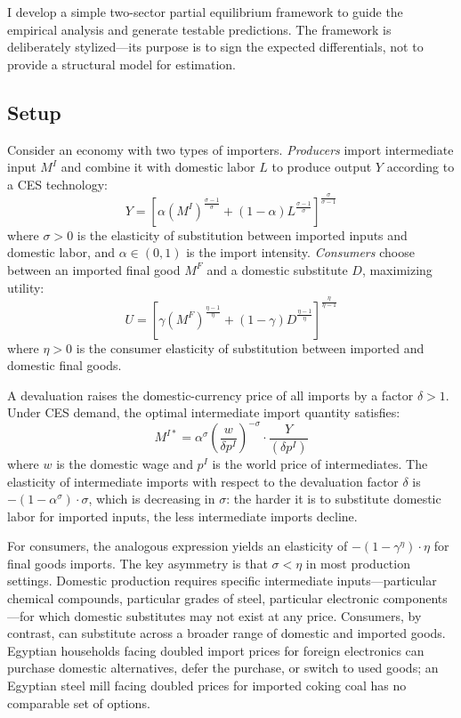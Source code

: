 \documentclass[12pt]{article}
\begin{document}
I develop a simple two-sector partial equilibrium framework to guide the empirical analysis and generate testable predictions. The framework is deliberately stylized---its purpose is to sign the expected differentials, not to provide a structural model for estimation.

\subsection{Setup}

Consider an economy with two types of importers. \textit{Producers} import intermediate input $M^I$ and combine it with domestic labor $L$ to produce output $Y$ according to a CES technology:
\begin{equation}
Y = \left[ \alpha (M^I)^{\frac{\sigma-1}{\sigma}} + (1-\alpha) L^{\frac{\sigma-1}{\sigma}} \right]^{\frac{\sigma}{\sigma-1}}
\label{eq:production}
\end{equation}
where $\sigma > 0$ is the elasticity of substitution between imported inputs and domestic labor, and $\alpha \in (0,1)$ is the import intensity. \textit{Consumers} choose between an imported final good $M^F$ and a domestic substitute $D$, maximizing utility:
\begin{equation}
U = \left[ \gamma (M^F)^{\frac{\eta-1}{\eta}} + (1-\gamma) D^{\frac{\eta-1}{\eta}} \right]^{\frac{\eta}{\eta-1}}
\label{eq:utility}
\end{equation}
where $\eta > 0$ is the consumer elasticity of substitution between imported and domestic final goods.

A devaluation raises the domestic-currency price of all imports by a factor $\delta > 1$. Under CES demand, the optimal intermediate import quantity satisfies:
\begin{equation}
M^{I*} = \alpha^\sigma \left( \frac{w}{\delta p^I} \right)^{-\sigma} \cdot \frac{Y}{(\delta p^I)}
\label{eq:intermediate_demand}
\end{equation}
where $w$ is the domestic wage and $p^I$ is the world price of intermediates. The elasticity of intermediate imports with respect to the devaluation factor $\delta$ is $-(1-\alpha^\sigma) \cdot \sigma$, which is decreasing in $\sigma$: the harder it is to substitute domestic labor for imported inputs, the less intermediate imports decline.

For consumers, the analogous expression yields an elasticity of $-(1-\gamma^\eta) \cdot \eta$ for final goods imports. The key asymmetry is that $\sigma < \eta$ in most production settings. Domestic production requires specific intermediate inputs---particular chemical compounds, particular grades of steel, particular electronic components---for which domestic substitutes may not exist at any price. Consumers, by contrast, can substitute across a broader range of domestic and imported goods. Egyptian households facing doubled import prices for foreign electronics can purchase domestic alternatives, defer the purchase, or switch to used goods; an Egyptian steel mill facing doubled prices for imported coking coal has no comparable set of options.
\end{document}
